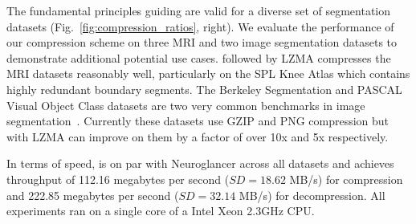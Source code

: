 The fundamental principles guiding \appName are valid for a diverse set of segmentation datasets (Fig.~\ref{fig:compression_ratios}, right). We evaluate the performance of our compression scheme on three MRI and two image segmentation datasets to demonstrate additional potential use cases. \appName followed by LZMA compresses the MRI datasets reasonably well, particularly on the SPL Knee Atlas which contains highly redundant boundary segments.
The Berkeley Segmentation and PASCAL Visual Object Class datasets are two very common benchmarks in image segmentation~\cite{pascal-voc-2012,MartinFTM01}. Currently these datasets use GZIP and PNG compression but \appName with LZMA can improve on them by a factor of over 10x and 5x respectively. 

In terms of speed, \appName is on par with Neuroglancer across all datasets and achieves throughput of 112.16 megabytes per second ($SD = 18.62$ MB/s) for compression and 222.85 megabytes per second ($SD = 32.14$ MB/s) for decompression. All experiments ran on a single core of a Intel Xeon 2.3GHz CPU.


